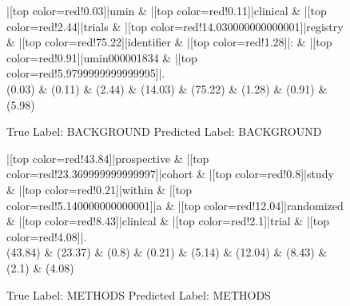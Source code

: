 \documentclass[a4paper, landscape]{article}
\begin{document}
\clearpage
\begin{figure}
\begin{center}
\begin{dependency}
\begin{deptext}
|[top color=red!0.03]|umin \& |[top color=red!0.11]|clinical \& |[top color=red!2.44]|trials \& |[top color=red!14.030000000000001]|registry \& |[top color=red!75.22]|identifier \& |[top color=red!1.28]|: \& |[top color=red!0.91]|umin000001834 \& |[top color=red!5.9799999999999995]|.\\
(0.03) \& (0.11) \& (2.44) \& (14.03) \& (75.22) \& (1.28) \& (0.91) \& (5.98)\\
\end{deptext}
\end{dependency}
\end{center}
\caption{True Label: BACKGROUND Predicted Label: BACKGROUND}
\end{figure}
\clearpage
\begin{figure}
\begin{center}
\begin{dependency}
\begin{deptext}
|[top color=red!43.84]|prospective \& |[top color=red!23.369999999999997]|cohort \& |[top color=red!0.8]|study \& |[top color=red!0.21]|within \& |[top color=red!5.140000000000001]|a \& |[top color=red!12.04]|randomized \& |[top color=red!8.43]|clinical \& |[top color=red!2.1]|trial \& |[top color=red!4.08]|.\\
(43.84) \& (23.37) \& (0.8) \& (0.21) \& (5.14) \& (12.04) \& (8.43) \& (2.1) \& (4.08)\\
\end{deptext}
\end{dependency}
\end{center}
\caption{True Label: METHODS Predicted Label: METHODS}
\end{figure}
\clearpage
\end{document}
